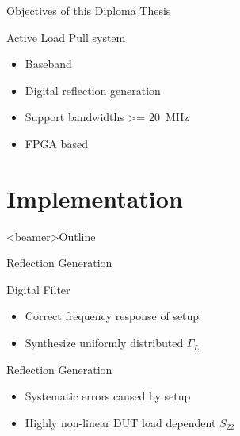 \documentclass{beamer}
\begin{document}
\begin{frame}{Objectives of this Diploma Thesis}
    \begin{block}{Active Load Pull system}
        \begin{itemize}
            \item Baseband
            \item Digital reflection generation
            \item Support bandwidths \SI{>= 20}{\mega\hertz}
            \item FPGA based
        \end{itemize}
    \end{block}
\end{frame}


\section{Implementation}

\begin{frame}<beamer>{Outline}
    \tableofcontents[currentsection]
\end{frame}

\begin{frame}{Reflection Generation}
    \begin{block}{Digital Filter}
        \begin{itemize}
            \item Correct frequency response of setup
            \item Synthesize uniformly distributed $\Gamma_L$
        \end{itemize}
    \end{block}
    \begin{block}{Reflection Generation}
        \begin{itemize}
            \item Systematic errors caused by setup
            \item Highly non-linear DUT load dependent $S_{22}$
        \end{itemize}
    \end{block}
\end{frame}

\end{document}
